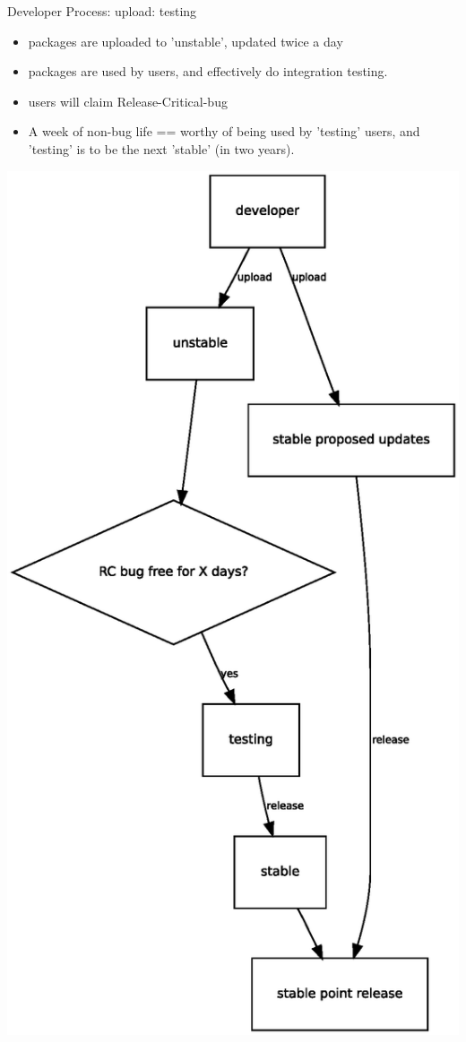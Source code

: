 \documentclass[cjk,dvipdfm,12pt]{beamer}
\begin{document}
\begin{frame}{Developer Process: upload: testing}

\begin{minipage}{0.5\hsize}
  \begin{itemize}
   \item packages are uploaded to 'unstable', updated twice a day
   \item packages are used by users, and effectively do integration testing.
   \item users will claim Release-Critical-bug
   \item A week of non-bug life == worthy of being used by 'testing'
	 users, and 'testing' is to be the next 'stable' (in two years).
 \end{itemize}
\end{minipage}
\begin{minipage}{0.4\hsize}
 \includegraphics[width=1\hsize]{image200805/testingcycle.eps}

\end{minipage}
\end{frame}
\end{document}
